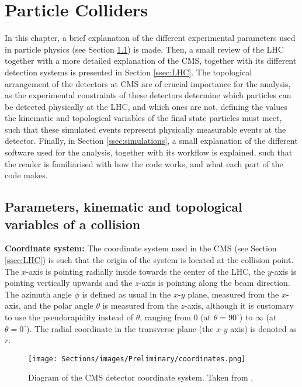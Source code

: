 \clearpage
\vspace{1cm}
\section{Particle Colliders} \label{sec:colliders}
\vspace{1cm}

In this chapter, a brief explanation of the different experimental parameters used in particle physics (see Section \ref{ssec:variables}) is made. Then, a small review of the LHC together with a more detailed explanation of the CMS, together with its different detection systems is presented in Section \ref{ssec:LHC}. The topological arrangement of the detectors at CMS are of crucial importance for the analysis, as the experimental constraints of these detectors determine which particles can be detected physically at the LHC, and which ones are not, defining the values the kinematic and topological variables of the final state particles must meet, such that these simulated events represent physically measurable events at the detector. Finally, in Section \ref{ssec:simulations}, a small explanation of the different software used for the analysis, together with its workflow is explained, such that the reader is familiarised with how the code works, and what each part of the code makes.

\subsection{Parameters, kinematic and topological variables of a collision} \label{ssec:variables}

\textbf{Coordinate system:} The coordinate system used in the CMS (see Section \ref{ssec:LHC}) is such that the origin of the system is located at the collision point. The $x$-axis is pointing radially inside towards the center of the LHC, the $y$-axis is pointing vertically upwards and the $z$-axis is pointing along the beam direction. The azimuth angle $\phi$ is defined as usual in the $x$-$y$ plane, measured from the $x$-axis, and the polar angle $\theta$ is measured from the $z$-axis, although it is customary to use the pseudorapidity instead of $\theta$, ranging from 0 (at $\theta = 90^{\circ}$) to $\infty$ (at $\theta = 0^{\circ}$). The radial coordinate in the transverse plane (the $x$-$y$ axis) is denoted as $r$.

\begin{figure}[ht!]
    \centering
    \texttt{[image: Sections/images/Preliminary/coordinates.png]}
    \caption{Diagram of the CMS detector coordinate system. Taken from \cite{CMScoordinate}.}
    \label{Coordinates}
\end{figure}


